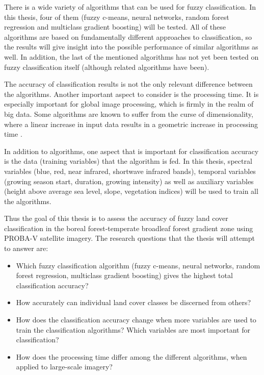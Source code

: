 \documentclass[a4paper,10pt]{article}
\begin{document}
There is a wide variety of algorithms that can be used for fuzzy classification. In this thesis, four of them (fuzzy c-means, neural networks, random forest regression and multiclass gradient boosting) will be tested. All of these algorithms are based on fundamentally different approaches to classification, so the results will give insight into the possible performance of similar algorithms as well. In addition, the last of the mentioned algorithms has not yet been tested on fuzzy classification itself (although related algorithms have been).

The accuracy of classification results is not the only relevant difference between the algorithms. Another important aspect to consider is the processing time. It is especially important for global image processing, which is firmly in the realm of big data. Some algorithms are known to suffer from the curse of dimensionality, where a linear increase in input data results in a geometric increase in processing time \cite{walton2008subpixelrf}.

In addition to algorithms, one aspect that is important for classification accuracy is the data (training variables) that the algorithm is fed. In this thesis, spectral variables (blue, red, near infrared, shortwave infrared bands), temporal variables (growing season start, duration, growing intensity) as well as auxiliary variables (height above average sea level, slope, vegetation indices) will be used to train all the algorithms.

Thus the goal of this thesis is to assess the accuracy of fuzzy land cover classification in the boreal forest-temperate broadleaf forest gradient zone using PROBA-V satellite imagery. The research questions that the thesis will attempt to answer are:

\begin{itemize}
 \item Which fuzzy classification algorithm (fuzzy c-means, neural networks, random forest regression, multiclass gradient boosting) gives the highest total classification accuracy?
 \item How accurately can individual land cover classes be discerned from others?
 \item How does the classification accuracy change when more variables are used to train the classification algorithms? Which variables are most important for classification?
 \item How does the processing time differ among the different algorithms, when applied to large-scale imagery?
\end{itemize}
\end{document}
